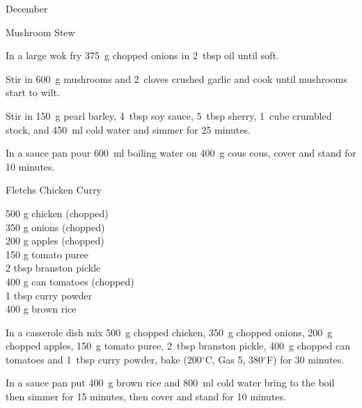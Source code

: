 \begin{menu}{December}
\begin{recipe}{2}{Mushroom Stew}
    \begin{instructions}
    \item 
        In a large wok fry
        375~g chopped onions
        in
        2~tbsp  oil
        until soft.
      \item 
        Stir in
        600~g  mushrooms
        and
        2~cloves crushed garlic
        and cook until mushrooms start to wilt.
      \item 
        Stir in
        150~g  pearl barley,
        4~tbsp  soy sauce,
        5~tbsp  sherry,
        1~cube crumbled stock,
        and
        450~ml  cold water
        and simmer for 25 minutes.
      \item 
      In a
      sauce pan pour 600~ml  boiling water
      on 400~g  cous cous, cover and
      stand for 10 minutes.
    
    \end{instructions}
    \end{recipe}%
  
    \begin{recipe}{2}{Fletchs Chicken Curry}%
		\begin{ingredients}
		500 g chicken (chopped) \\
	350 g onions (chopped) \\
	200 g apples (chopped) \\
	150 g tomato puree  \\
	2 tbsp branston pickle  \\
	400 g can tomatoes (chopped) \\
	1 tbsp curry powder  \\
	400 g brown rice  \\
	
		\end{ingredients}
	
	
    \begin{instructions}
    \item 
        In a casserole dish mix
        500~g chopped chicken,
        350~g chopped onions,
        200~g chopped apples,
        150~g  tomato puree,
        2~tbsp  branston pickle,
        400~g chopped can tomatoes
        and
        1~tbsp  curry powder,
        bake (200$^{\circ}$C, Gas 5, 380$^{\circ}$F) for 30 minutes.
      \item 
      In a
      sauce pan
      put
      400~g  brown rice
      and
      800~ml  cold water
      bring to the boil then simmer for 15 minutes,
      then cover and stand for 10 minutes.
    
    \end{instructions}
    \end{recipe}%
  
    \clearpage
    \end{menu}
	
	
